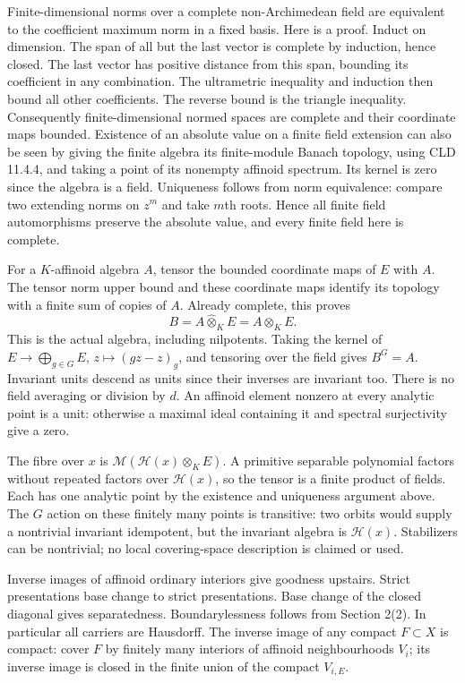 \documentclass[11pt]{article}
\begin{document}
Finite-dimensional norms over a complete non-Archimedean field are
equivalent to the coefficient maximum norm in a fixed basis. Here is a
proof. Induct on dimension. The span of all but the last vector is
complete by induction, hence closed. The last vector has positive
distance from this span, bounding its coefficient in any combination.
The ultrametric inequality and induction then bound all other
coefficients. The reverse bound is the triangle inequality. Consequently
finite-dimensional normed spaces are complete and their coordinate maps
bounded. Existence of an absolute value on a finite field extension can
also be seen by giving the finite algebra its finite-module Banach
topology, using CLD 11.4.4, and taking a point of its nonempty affinoid
spectrum. Its kernel is zero since the algebra is a field. Uniqueness
follows from norm equivalence: compare two extending norms on \(z^m\)
and take \(m\)th roots. Hence all finite field automorphisms preserve
the absolute value, and every finite field here is complete.

For a \(K\)-affinoid algebra \(A\), tensor the bounded coordinate maps
of \(E\) with \(A\). The tensor norm upper bound and these coordinate
maps identify its topology with a finite sum of copies of \(A\). Already
complete, this proves \[
             B=A\widehat\otimes_K E=A\otimes_K E.        \tag{5}
\] This is the actual algebra, including nilpotents. Taking the kernel
of \(E\to\bigoplus_{g\in G}E\), \(z\mapsto(gz-z)_g\), and tensoring over
the field gives \(B^G=A\). Invariant units descend as units since their
inverses are invariant too. There is no field averaging or division by
\(d\). An affinoid element nonzero at every analytic point is a unit:
otherwise a maximal ideal containing it and spectral surjectivity give a
zero.

The fibre over \(x\) is \(\mathcal M(\mathcal H(x)\otimes_K E)\). A
primitive separable polynomial factors without repeated factors over
\(\mathcal H(x)\), so the tensor is a finite product of fields. Each has
one analytic point by the existence and uniqueness argument above. The
\(G\) action on these finitely many points is transitive: two orbits
would supply a nontrivial invariant idempotent, but the invariant
algebra is \(\mathcal H(x)\). Stabilizers can be nontrivial; no local
covering-space description is claimed or used.

Inverse images of affinoid ordinary interiors give goodness upstairs.
Strict presentations base change to strict presentations. Base change of
the closed diagonal gives separatedness. Boundarylessness follows from
Section 2(2). In particular all carriers are Hausdorff. The inverse
image of any compact \(F\subset X\) is compact: cover \(F\) by finitely
many interiors of affinoid neighbourhoods \(V_i\); its inverse image is
closed in the finite union of the compact \(V_{i,E}\).
\end{document}
